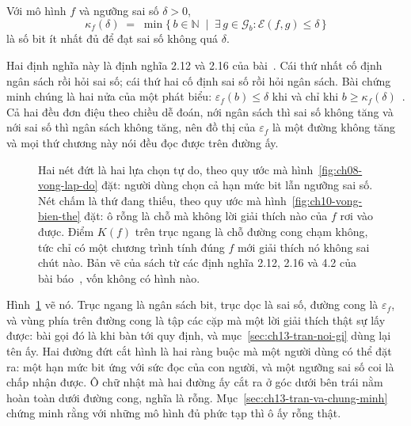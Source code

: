 \begin{definition}
\label{def:ch13-ham-do-phuc-tap}
Với mô hình $f$ và ngưỡng sai số $\delta > 0$,
\[
  \kappa_f(\delta) \;=\; \min \{\, b \in \mathbb{N} \;\mid\; \exists\, g \in \mathcal{G}_b : \mathcal{E}(f,g) \le \delta \,\}
\]
là số bit ít nhất đủ để đạt sai số không quá $\delta$.
\end{definition}

Hai định nghĩa này là định nghĩa 2.12 và 2.16 của bài~\autocite{p26limits}. Cái
thứ nhất cố định ngân sách rồi hỏi sai số; cái thứ hai cố định sai số rồi hỏi
ngân sách. Bài chứng minh chúng là hai nửa của một phát biểu: $\varepsilon_f(b)
\le \delta$ khi và chỉ khi $b \ge \kappa_f(\delta)$~\autocite{p26limits}. Cả hai
đều đơn điệu theo chiều dễ đoán, nới ngân sách thì sai số không tăng và nới sai
số thì ngân sách không tăng, nên đồ thị của $\varepsilon_f$ là một đường không
tăng và mọi thứ chương này nói đều đọc được trên đường ấy.

\begin{figure}[htbp]
  \centering
  
  \caption{Hai nét đứt là hai lựa chọn tự do, theo quy ước mà
  hình~\ref{fig:ch08-vong-lap-do} đặt: người dùng chọn cả hạn mức bit lẫn ngưỡng
  sai số. Nét chấm là thứ đang thiếu, theo quy ước mà
  hình~\ref{fig:ch10-vong-bien-the} đặt: ô rỗng là chỗ mà không lời giải thích
  nào của $f$ rơi vào được. Điểm $K(f)$ trên trục ngang là chỗ
  đường cong chạm không, tức chỉ có một chương trình tính đúng $f$ mới giải
  thích nó không sai chút nào. Bản vẽ của sách từ các định nghĩa 2.12, 2.16 và
  4.2 của bài báo~\autocite{p26limits}, vốn không có hình nào.}
  \label{fig:ch13-mien-kha-thi}
\end{figure}

Hình~\ref{fig:ch13-mien-kha-thi} vẽ nó. Trục ngang là ngân sách bit, trục dọc là
sai số, đường cong là $\varepsilon_f$, và vùng phía trên đường cong là tập các
cặp mà một lời giải thích thật sự lấy được: bài gọi đó là  khi bàn tới quy định, và
mục~\ref{sec:ch13-tran-noi-gi} dùng lại tên ấy. Hai đường đứt cắt hình là hai
ràng buộc mà một người dùng có thể đặt ra: một hạn mức bit ứng với sức đọc của
con người, và một ngưỡng sai số coi là chấp nhận được. Ô chữ nhật mà hai đường
ấy cắt ra ở góc dưới bên trái nằm hoàn toàn dưới đường cong, nghĩa là rỗng.
Mục~\ref{sec:ch13-tran-va-chung-minh} chứng minh rằng với những mô hình đủ phức
tạp thì ô ấy rỗng thật.

%
